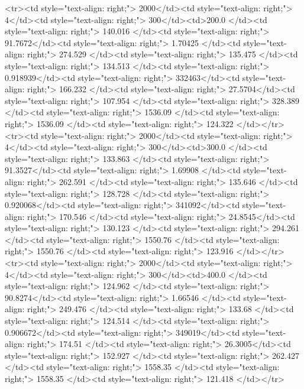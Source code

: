 <tr><td style="text-align: right;">      2000</td><td style="text-align: right;">         4</td><td style="text-align: right;">           300</td><td>200.0        </td><td style="text-align: right;">               140.016 </td><td style="text-align: right;">            91.7672</td><td style="text-align: right;">         1.70425 </td><td style="text-align: right;">        274.529 </td><td style="text-align: right;">           135.475 </td><td style="text-align: right;">             134.513   </td><td style="text-align: right;">             0.918939</td><td style="text-align: right;">              332463</td><td style="text-align: right;">                      166.232 </td><td style="text-align: right;">            27.5704</td><td style="text-align: right;">               107.954  </td><td style="text-align: right;">       328.389 </td><td style="text-align: right;">   1536.09 </td><td style="text-align: right;">      1536.09 </td><td style="text-align: right;">                124.322 </td></tr>
<tr><td style="text-align: right;">      2000</td><td style="text-align: right;">         4</td><td style="text-align: right;">           300</td><td>300.0        </td><td style="text-align: right;">               133.863 </td><td style="text-align: right;">            91.3527</td><td style="text-align: right;">         1.69908 </td><td style="text-align: right;">        262.591 </td><td style="text-align: right;">           135.646 </td><td style="text-align: right;">             128.728   </td><td style="text-align: right;">             0.920068</td><td style="text-align: right;">              341092</td><td style="text-align: right;">                      170.546 </td><td style="text-align: right;">            24.8545</td><td style="text-align: right;">               130.123  </td><td style="text-align: right;">       294.261 </td><td style="text-align: right;">   1550.76 </td><td style="text-align: right;">      1550.76 </td><td style="text-align: right;">                123.916 </td></tr>
<tr><td style="text-align: right;">      2000</td><td style="text-align: right;">         4</td><td style="text-align: right;">           300</td><td>400.0        </td><td style="text-align: right;">               124.962 </td><td style="text-align: right;">            90.8274</td><td style="text-align: right;">         1.66546 </td><td style="text-align: right;">        249.476 </td><td style="text-align: right;">           133.68  </td><td style="text-align: right;">             124.514   </td><td style="text-align: right;">             0.906672</td><td style="text-align: right;">              349019</td><td style="text-align: right;">                      174.51  </td><td style="text-align: right;">            26.3005</td><td style="text-align: right;">               152.927  </td><td style="text-align: right;">       262.427 </td><td style="text-align: right;">   1558.35 </td><td style="text-align: right;">      1558.35 </td><td style="text-align: right;">                121.418 </td></tr>
